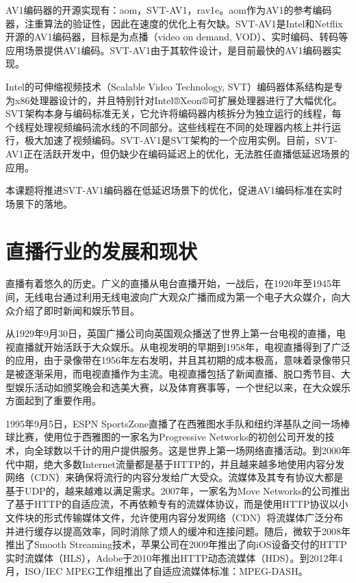 AV1编码器的开源实现有：aom\cite{AV1SourceCode2020}，SVT-AV1\cite{ScalableVideoTechnology2020}，rav1e\cite{Rav1eGitRepository2020}。aom作为AV1的参考编码器，注重算法的验证性，因此在速度的优化上有欠缺。SVT-AV1是Intel和Netflix开源的AV1编码器，目标是为点播（video on demand, VOD）、实时编码、转码等应用场景提供AV1编码。SVT-AV1由于其软件设计，是目前最快的AV1编码器实现。

Intel的可伸缩视频技术（Scalable Video Technology, SVT）\cite{awsScalableVideoTechnology2019}编码器体系结构是专为x86处理器设计的，并且特别针对Intel®Xeon®可扩展处理器进行了大幅优化。SVT架构本身与编码标准无关，它允许将编码器内核拆分为独立运行的线程，每个线程处理视频编码流水线的不同部分。这些线程在不同的处理器内核上并行运行，极大加速了视频编码。SVT-AV1是SVT架构的一个应用实例。目前，SVT-AV1正在活跃开发中，但仍缺少在编码延迟上的优化，无法胜任直播低延迟场景的应用。

本课题将推进SVT-AV1编码器在低延迟场景下的优化，促进AV1编码标准在实时场景下的落地。

\section{直播行业的发展和现状}

直播有着悠久的历史。广义的直播从电台直播开始，一战后，在1920年至1945年间，无线电台通过利用无线电波向广大观众广播而成为第一个电子大众媒介，向大众介绍了即时新闻和娱乐节目。

从1929年9月30日，英国广播公司向英国观众播送了世界上第一台电视的直播，电视直播就开始活跃于大众娱乐。从电视发明的早期到1958年，电视直播得到了广泛的应用，由于录像带在1956年左右发明，并且其初期的成本极高，意味着录像带只是被逐渐采用，而电视直播作为主流。电视直播包括了新闻直播、脱口秀节目、大型娱乐活动如颁奖晚会和选美大赛，以及体育赛事等，一个世纪以来，在大众娱乐方面起到了重要作用。

1995年9月5日，ESPN SportsZone直播了在西雅图水手队和纽约洋基队之间一场棒球比赛，使用位于西雅图的一家名为Progressive Networks的初创公司开发的技术，向全球数以千计的用户提供服务。这是世界上第一场网络直播活动。到2000年代中期，绝大多数Internet流量都是基于HTTP的，并且越来越多地使用内容分发网络（CDN）来确保将流行的内容分发给广大受众。流媒体及其专有协议大都是基于UDP的，越来越难以满足需求。2007年，一家名为Move Networks的公司推出了基于HTTP的自适应流，不再依赖专有的流媒体协议，而是使用HTTP协议以小文件块的形式传输媒体文件，允许使用内容分发网络（CDN）将流媒体广泛分布并进行缓存以提高效率，同时消除了烦人的缓冲和连接问题。随后，微软于2008年推出了Smooth Streaming技术，苹果公司在2009年推出了向iOS设备交付的HTTP实时流媒体（HLS），Adobe于2010年推出HTTP动态流媒体（HDS）。到2012年4月，ISO/IEC MPEG工作组推出了自适应流媒体标准：MPEG-DASH。

